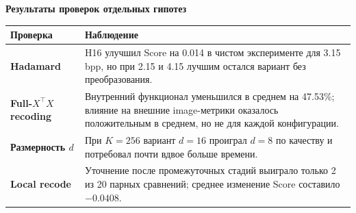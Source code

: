\documentclass[11pt,a4paper]{article}
\newcommand{\subsectiontitle}[1]{%
  \vspace{0.10cm}
  {\normalsize\bfseries\color{msured} #1}\par\vspace{0.04cm}
}
\begin{document}
\begin{center}
\end{center}

\subsectiontitle{Результаты проверок отдельных гипотез}

\begin{center}
\small
\begin{tabularx}{\textwidth}{>{\bfseries}p{3.8cm}X}
  \toprule
  Проверка & Наблюдение \\
  \midrule
  Hadamard & H16 улучшил Score на 0.014 в чистом эксперименте для 3.15 bpp, но при 2.15 и 4.15 лучшим остался вариант без преобразования. \\
  Full-$X^\top X$ recoding & Внутренний функционал уменьшился в среднем на 47.53\%; влияние на внешние image-метрики оказалось положительным в среднем, но не для каждой конфигурации. \\
  Размерность $d$ & При $K=256$ вариант $d=16$ проиграл $d=8$ по качеству и потребовал почти вдвое больше времени. \\
  Local recode & Уточнение после промежуточных стадий выиграло только 2 из 20 парных сравнений; среднее изменение Score составило $-0.0408$. \\
  \bottomrule
\end{tabularx}
\end{center}
\end{document}
